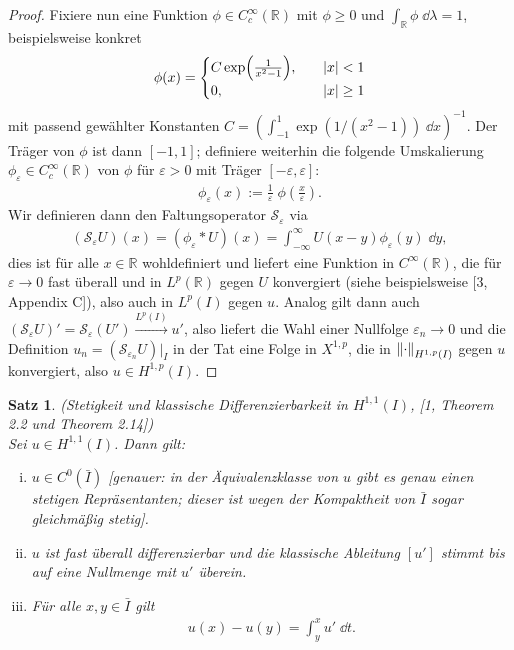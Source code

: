\documentclass[twoside]{article}
\newcounter{lecnum}
\renewcommand{\cite}[1]{[#1]}
\newtheorem{theorem}{Satz}[lecnum]
\theoremstyle{definition}
\newcommand{\calS}{\mathcal{S}}
\newcommand{\R}{\mathbb{R}}
\newcommand{\lk}{\left(}
\newcommand{\rk}{\right)}
\begin{document}
\begin{proof}
Fixiere nun eine Funktion $\phi \in C^\infty_c(\R)$ mit $\phi \geq 0$ und $\int_\R \phi \; \dd \lambda = 1$, beispielsweise konkret
\begin{align*}
\phi(x) = \begin{cases}
C \exp(\frac{1}{x^2 - 1}), \quad &\abs{x} < 1\\
0, \quad &\abs{x} \geq 1
\end{cases}
\end{align*}
mit passend gewählter Konstanten $C = \lk \int_{-1}^1 \exp(1/(x^2-1)) \; \dd x \rk^{-1}$. Der Träger von $\phi$ ist dann $[-1,1]$; definiere weiterhin die folgende Umskalierung $\phi_\varepsilon \in C^\infty_c(\R)$ von $\phi$ für $\varepsilon > 0$ mit Träger $[-\varepsilon, \varepsilon]$:
\begin{align*}
\phi_\varepsilon(x) := \frac{1}{\varepsilon} \; \phi \lk \frac{x}{\varepsilon} \rk.
\end{align*}
Wir definieren dann den Faltungsoperator $\calS_\varepsilon$ via
\begin{align*}
(\calS_\varepsilon U)(x) = (\phi_\varepsilon * U)(x) = \int_{- \infty}^\infty U(x-y) \phi_\varepsilon(y) \; \dd y,
\end{align*}
dies ist für alle $x \in \R$ wohldefiniert und liefert eine Funktion in $C^\infty(\R)$, die für $\varepsilon \to 0$ fast überall und in $L^p(\R)$ gegen $U$ konvergiert (siehe beispielsweise \cite{3, Appendix C}), also auch in $L^p(I)$ gegen $u$. Analog gilt dann auch $(\calS_\varepsilon U)' = \calS_\varepsilon (U') \xrightarrow{L^p(I)} u'$, also liefert die Wahl einer Nullfolge $\varepsilon_n \to 0$ und die Definition $u_n = (\calS_{\varepsilon_n} U) \vert_I$ in der Tat eine Folge in $X^{1,p}$, die in $\norm{\cdot}_{H^{1,p}(I)}$ gegen $u$ konvergiert, also $u \in H^{1,p}(I)$.
\end{proof}
\begin{theorem} (Stetigkeit und klassische Differenzierbarkeit in $H^{1,1}(I)$, \cite{1, Theorem 2.2 und Theorem 2.14}) \label{thm:sobofolg} \\
Sei $u \in H^{1,1}(I)$. Dann gilt:
\begin{enumerate}[(i)]
\item $u \in C^0(\bar{I})$ [genauer: in der Äquivalenzklasse von $u$ gibt es genau einen stetigen Repräsentanten; dieser ist wegen der Kompaktheit von $\bar{I}$ sogar gleichmäßig stetig].
\item $u$ ist fast überall differenzierbar und die klassische Ableitung $[u']$ stimmt bis auf eine Nullmenge mit $u'$ überein.
\item Für alle $x,y \in \bar{I}$ gilt
\begin{align}
u(x)-u(y) = \int_y^x u' \; \dd t.
\end{align}
\end{enumerate} 
\end{theorem}
\end{document}
